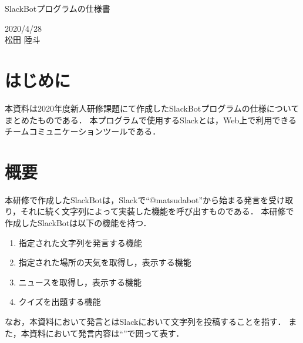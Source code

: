 \documentclass[12pt]{jsarticle}
\begin{document}
\begin{center}
{\LARGE SlackBotプログラムの仕様書}
\end{center}

\begin{flushright}
  2020/4/28\\
  松田 陸斗
\end{flushright}
\section{はじめに}
\label{sec:introduction}
本資料は2020年度新人研修課題にて作成したSlackBotプログラムの仕様についてまとめたものである．
本プログラムで使用するSlack\cite{Slack}とは，Web上で利用できるチームコミュニケーションツールである．

\section{概要}
本研修で作成したSlackBotは，Slackで``@matsudabot''から始まる発言を受け取り，それに続く文字列によって実装した機能を呼び出すものである．
本研修で作成したSlackBotは以下の機能を持つ．
\begin{enumerate}
\item 指定された文字列を発言する機能
\item 指定された場所の天気を取得し，表示する機能
\item ニュースを取得し，表示する機能
\item クイズを出題する機能
\end{enumerate}
なお，本資料において発言とはSlackにおいて文字列を投稿することを指す．
また，本資料において発言内容は``''で囲って表す．
\end{document}
